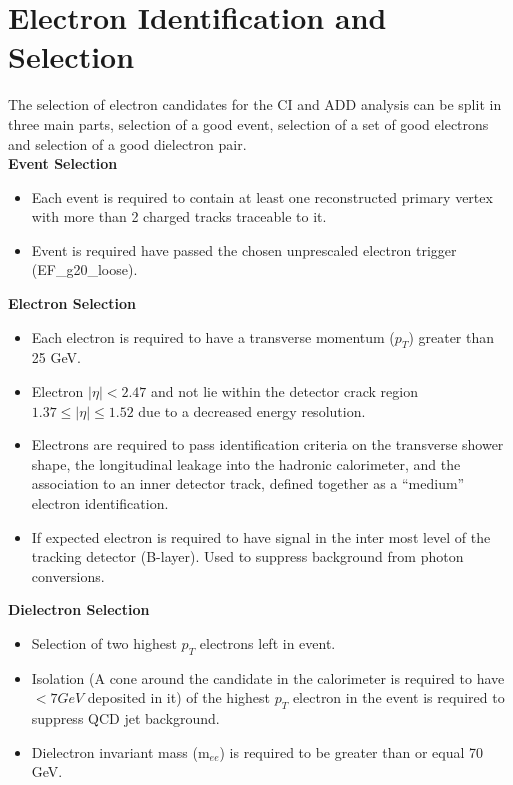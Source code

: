 \section{Electron Identification and Selection}

	The selection of electron candidates for the CI and ADD analysis can be split in three main parts, selection of a good event, selection of a set of good electrons and selection of a good dielectron pair.\\

	{\bf Event Selection}
	\begin{itemize}
	\item Each event is required to contain at least one reconstructed primary vertex with more than 2 charged tracks traceable to it.
	\item Event is required have passed the chosen unprescaled electron trigger (EF\_g20\_loose).
	\end{itemize}

	{\bf Electron Selection}
	\begin{itemize}
	\item Each electron is required to have a transverse momentum ($p_{T}$) greater than 25 GeV.
	\item Electron $|\eta| < 2.47$ and not lie within the detector crack region $1.37 \leq |\eta| \leq 1.52$ due to a decreased energy resolution.
	\item Electrons are required to pass identification criteria on the transverse shower shape, the longitudinal leakage into the hadronic calorimeter, and the association to an inner detector track, defined together as a ``medium'' electron identification.
	\item If expected electron is required to have signal in the inter most level of the tracking detector (B-layer). Used to suppress background from photon conversions.
	\end{itemize}

	{\bf Dielectron Selection}
	\begin{itemize}
	\item Selection of two highest $p_{T}$ electrons left in event.
	\item Isolation (A cone around the candidate in the calorimeter is required to have $< 7 GeV$ deposited in it) of the highest $p_{T}$ electron in the event is required to suppress QCD jet background. 
	\item Dielectron invariant mass (m$_{ee}$) is required to be greater than or equal 70 GeV.
	\end{itemize}

